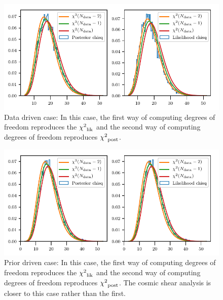 \documentclass[11pt]{article}
\newcommand{\chisq}{{\chi^{2}}}
\begin{document}
\begin{figure}
\includegraphics[scale=0.9]{Data_driven.pdf}
\caption{Data driven case: In this case, the first way of computing degrees of
freedom reproduces the $\chisq_{\rm lik}$ and the second way of computing
degrees of freedom reproduces $\chisq_{\rm post}$.}
\label{fig1}
\end{figure}

\begin{figure}
\includegraphics[scale=0.9]{Prior_driven.pdf}
\caption{Prior driven case: In this case, the first way of computing degrees of
freedom reproduces the $\chisq_{\rm lik}$ and the second way of computing
degrees of freedom reproduces $\chisq_{\rm post}$. The cosmic shear analysis is
closer to this case rather than the first.}
\label{fig2}
\end{figure}
\end{document}
